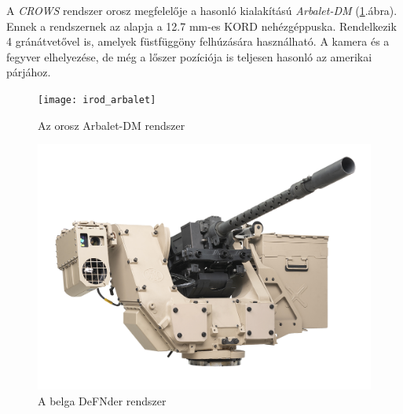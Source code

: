 \documentclass[11pt,a4paper]{article}
\begin{document}
A \textsl{CROWS} rendszer orosz megfelelője a hasonló kialakítású \textsl{Arbalet-DM} (\ref{fig:irod_arbalet}.ábra). Ennek a rendszernek az alapja a 12.7 mm-es KORD nehézgéppuska. Rendelkezik 4 gránátvetővel is, amelyek füstfüggöny felhúzására használható. A kamera és a fegyver elhelyezése, de még a lőszer pozíciója is teljesen hasonló az amerikai párjához.

\begin{figure}[h!]
	\centering
	\texttt{[image: irod\_arbalet]}
	\caption{Az orosz Arbalet-DM rendszer}
	\label{fig:irod_arbalet}
\end{figure}


\begin{figure}[h!]
	\centering
	\includegraphics[width=1\linewidth]{irod_defnder}
	\caption{A belga DeFNder rendszer}
	\label{fig:irod_defnder}
\end{figure}
\end{document}
